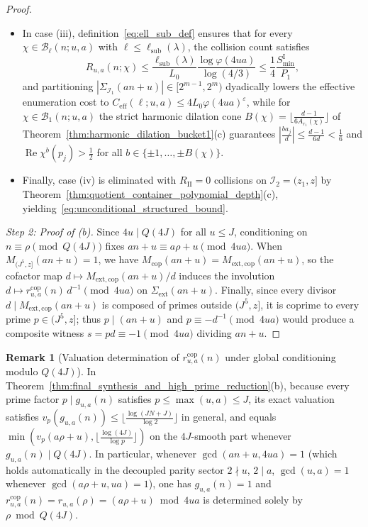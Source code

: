 \documentclass[11pt, a4paper]{article}
\theoremstyle{plain}
\theoremstyle{definition}
\newtheorem{remark}[theorem]{Remark}
\begin{document}
\begin{proof}
\begin{itemize}
    \item In case (iii), definition~\eqref{eq:ell_sub_def} ensures that for every $\chi\in\mathcal{B}_\ell(n;u,a)$ with $\ell\le\ell_{\mathrm{sub}}(\lambda)$, the collision count satisfies 
    \[
    R_{u,a}(n;\chi)\le\frac{\ell_{\mathrm{sub}}(\lambda)}{L_0}\frac{\log\varphi(4ua)}{\log(4/3)}\le\frac14\frac{S_{\min}^{\mathrm{I}}}{P_1},
    \]
    and partitioning $|\Sigma_{\mathcal{I}_1}(an+u)|\in[2^{m-1},2^{m})$ dyadically lowers the effective enumeration cost to $C_{\mathrm{eff}}(\ell;u,a)\le\allowbreak 4L_0\varphi(4ua)^{\varepsilon}$, while for $\chi\in\mathcal{B}_1(n;u,a)$ the strict harmonic dilation cone $B(\chi)=\allowbreak\lfloor\frac{d-1}{6A_{r_1}(\chi)}\rfloor$ of Theorem~\ref{thm:harmonic_dilation_bucket1}(c) guarantees $|\frac{ba_j}{d}|\le\allowbreak\frac{d-1}{6d}<\frac16$ and $\operatorname{Re}\chi^{b}(p_j)>\frac12$ for all $b\in\{\pm1,\dots,\pm B(\chi)\}$.
    
    \item Finally, case (iv) is eliminated with $R_{\mathrm{II}}=0$ collisions on $\mathcal{I}_2=(z_1,z]$ by Theorem~\ref{thm:quotient_container_polynomial_depth}(c), yielding~\eqref{eq:unconditional_structured_bound}.
\end{itemize}

\medskip\noindent\emph{Step 2: Proof of (b).}
Since $4u\mid Q(4J)$ for all $u\le J$, conditioning on $n\equiv\rho\pmod{Q(4J)}$ fixes $an+u\equiv a\rho+u\pmod{4ua}$. When $M_{(J^{5},z]}(an+u)=1$, we have $M_{\mathrm{cop}}(an+u)=M_{\mathrm{ext,cop}}(an+u)$, so the cofactor map $d\mapsto M_{\mathrm{ext,cop}}(an+u)/d$ induces the involution $d\mapsto r_{u,a}^{\mathrm{cop}}(n)\,d^{-1}\pmod{4ua}$ on $\Sigma_{\mathrm{ext}}(an+u)$. Finally, since every divisor $d\mid M_{\mathrm{ext,cop}}(an+u)$ is composed of primes outside $(J^{5},z]$, it is coprime to every prime $p\in(J^{5},z]$; thus $p\mid(an+u)$ and $p\equiv-d^{-1}\pmod{4ua}$ would produce a composite witness $s=pd\equiv-1\pmod{4ua}$ dividing $an+u$.
\end{proof}

\begin{remark}[Valuation determination of $r_{u,a}^{\mathrm{cop}}(n)$ under global conditioning modulo $Q(4J)$]
In Theorem~\ref{thm:final_synthesis_and_high_prime_reduction}(b), because every prime factor $p\mid g_{u,a}(n)$ satisfies $p\le\max(u,a)\le J$, its exact valuation satisfies $v_p(g_{u,a}(n))\le\allowbreak\lfloor\frac{\log(JN+J)}{\log 2}\rfloor$ in general, and equals $\min(v_p(a\rho+u),\allowbreak\lfloor\frac{\log(4J)}{\log p}\rfloor)$ on the $4J$-smooth part whenever $g_{u,a}(n)\mid Q(4J)$. In particular, whenever $\gcd(an+u,4ua)=1$ (which holds automatically in the decoupled parity sector $2\nmid u$, $2\mid a$, $\gcd(u,a)=1$ whenever $\gcd(a\rho+u,ua)=1$), one has $g_{u,a}(n)=1$ and $r_{u,a}^{\mathrm{cop}}(n)=\allowbreak r_{u,a}(\rho)=\allowbreak(a\rho+u)\bmod 4ua$ is determined solely by $\rho\bmod Q(4J)$.
\end{remark}
\end{document}
